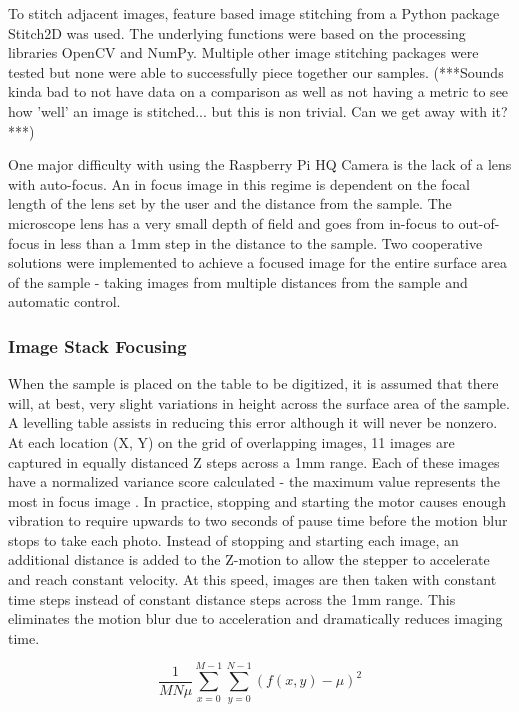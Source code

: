 \documentclass[a4paper,12pt]{article}
\begin{document}
To stitch adjacent images, feature based image stitching from a Python package Stitch2D was used. The underlying functions were based on the processing libraries
OpenCV and NumPy. Multiple other image stitching packages were tested but none were able to successfully piece together our samples. (***Sounds kinda bad to not have data on a comparison as well as not having a metric to see how 'well' an image is stitched... but this is non trivial. Can we get away with it?***)

One major difficulty with using the Raspberry Pi HQ Camera is the lack of a lens with auto-focus. An in focus image in this regime is dependent on the focal length of the lens set by the user and the
distance from the sample. The microscope lens has a very small depth of field and goes from in-focus to out-of-focus in less than a 1mm step in the distance to the sample. Two cooperative solutions were implemented 
to achieve a focused image for the entire surface area of the sample - taking images from multiple distances from the sample and automatic control. 

\subsubsection{Image Stack Focusing}
When the sample is placed on the table to be digitized, it is assumed that there will, at best, very slight variations in height across the surface area of the sample. A levelling table 
assists in reducing this error although it will never be nonzero. At each location (X, Y) on the grid of overlapping images, 11 images are captured in equally distanced Z steps across a 1mm range. 
Each of these images have a normalized variance score calculated - the maximum value represents the most in focus image \citep{sampat_extensive_2014}. In practice, stopping and starting the motor causes 
enough vibration to require upwards to two seconds of pause time before the motion blur stops to take each photo. Instead of stopping and starting each image, an additional distance is added to the 
Z-motion to allow the stepper to accelerate and reach constant velocity. At this speed, images are then taken with constant time steps instead of constant distance steps across the 1mm range. This eliminates
the motion blur due to acceleration and dramatically reduces imaging time. 

$$\frac{1}{MN\mu} \sum\limits_{x=0}^{M-1} \sum\limits_{y=0}^{N-1}(f(x,y) - \mu)^2$$
\end{document}

